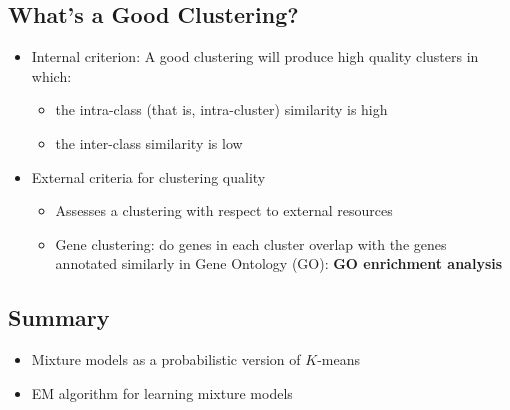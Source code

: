 \documentclass[10pt]{article}
\begin{document}
\subsection*{What's a Good Clustering?}
\begin{itemize}
	\item Internal criterion: A good clustering will produce high quality clusters in which:
	\begin{itemize}
	    \item the intra-class (that is, intra-cluster) similarity is high
	    \item the inter-class similarity is low
    \end{itemize}
    \item External criteria for clustering quality
    \begin{itemize}
	    \item Assesses a clustering with respect to external resources
	    \item Gene clustering: do genes in each cluster overlap with the genes annotated similarly in Gene Ontology (GO): \textbf{GO enrichment analysis}
    \end{itemize}
\end{itemize}

\subsection*{Summary}
\begin{itemize}
	\item Mixture models as a probabilistic version of $K$-means
	\item EM algorithm for learning mixture models
\end{itemize}
\end{document}
